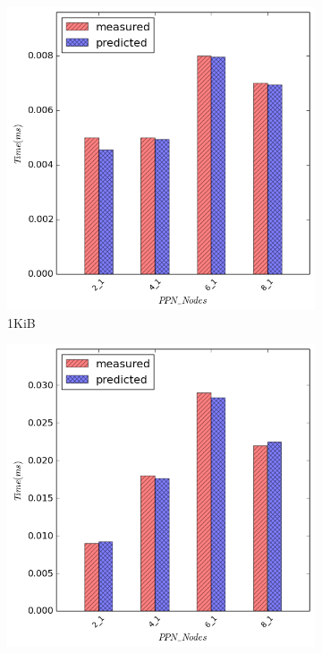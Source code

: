 \begin{figure}[ht]
\begin{subfigure}[b]{0.4\textwidth}
        \includegraphics[width=\textwidth]{./images/allreduce/allreduce_1024.png}
        \caption{1KiB}
    \end{subfigure}
    \quad
        \begin{subfigure}[b]{0.4\textwidth}
        \includegraphics[width=\textwidth]{./images/allreduce/allreduce_4096.png}

\end{subfigure}
\end{figure}
